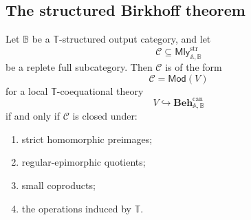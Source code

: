 \subsection{The structured Birkhoff theorem}
\label{subsec:T-coequational-birkhoff}

\begin{theorem}
\label{thm:T-coequational-birkhoff}
    Let \(\mathbb B\) be a \(\mathbb T\)-structured output category, and let
    \[
        \mathcal C
        \subseteq
        \mathsf{Mly}^{\mathrm{str}}_{\mathbb A,\mathbb B}
    \]
    be a replete full subcategory. Then \(\mathcal C\) is of the form
    \[
        \mathcal C=\mathsf{Mod}(V)
    \]
    for a local \(\mathbb T\)-coequational theory
    \[
        V\hookrightarrow
        \mathbf{Beh}^{\mathrm{can}}_{\mathbb A,\mathbb B}
    \]
    if and only if \(\mathcal C\) is closed under:

    \begin{enumerate}
        \item strict homomorphic preimages;
        \item regular-epimorphic quotients;
        \item small coproducts;
        \item the operations induced by \(\mathbb T\).
    \end{enumerate}
\end{theorem}

